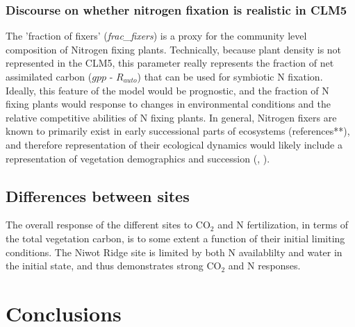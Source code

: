 \documentclass[draft,linenumbers]{agujournal}
\begin{document}
\subsubsection{Discourse on whether nitrogen fixation is realistic in CLM5}
The 'fraction of fixers' (\emph{frac\_fixers}) is a proxy for the community level composition of Nitrogen fixing plants. Technically, because plant density is not represented in the CLM5, this parameter really represents the fraction of net assimilated carbon ($gpp$ - $R_{auto}$) that can be used for symbiotic N fixation. Ideally, this feature of the model would be prognostic, and the fraction of N fixing plants would response to changes in environmental conditions and the relative competitive abilities of N fixing plants. In general, Nitrogen fixers are known to primarily exist in early successional parts of ecosystems (references**), and therefore representation of their ecological dynamics would likely include a representation of vegetation demographics and succession (\cite{fisher2018vegetation}, \cite{trugman2016climate}).

\subsection{Differences between sites}
The overall response of the different sites to CO$_{2}$ and N fertilization, in terms of the total vegetation carbon, is to some extent a function of their initial limiting conditions.  The Niwot Ridge site is limited by both N availablilty and water in the initial state, and thus demonstrates strong CO$_{2}$ and N responses. 

\section{Conclusions}




\nocite{*}

\clearpage
\end{document}
